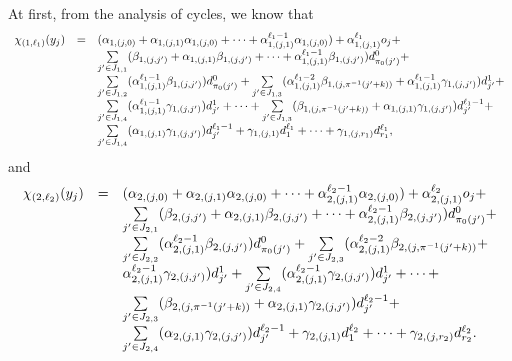 \documentclass[runningheads,a4paper]{llncs}
\begin{document}
At first, from the analysis of cycles, we know that
\[
\begin{array}{l c l}
\chi_{(1,\ell_1)}(y_j)  & = & (\alpha_{1,(j,0)} + \alpha_{1,(j,1)} \alpha_{1,(j,0)}+ \dots +\alpha^{\ell_1-1}_{1,(j,1)} \alpha_{1,(j,0)}) + \alpha^{\ell_1}_{1,(j,1)} o_j + \\
& & \sum \limits_{j' \in J_{1,1}} (\beta_{1,(j,j')}+\alpha_{1,(j,1)}\beta_{1,(j,j')} + \dots +\alpha^{\ell_1-1}_{1,(j,1)}  \beta_{1,(j,j')}) d^0_{\pi_0(j')} + \\
%
& & \sum \limits_{j' \in J_{1,2}} (\alpha^{\ell_1-1}_{1,(j,1)}\beta_{1,(j,j')}) d^0_{\pi_0(j')} +  \sum \limits_{j' \in J_{1,3}} (\alpha^{\ell_1-2}_{1,(j,1)}\beta_{1,(j, \pi^{-1}(j'+k))}+\alpha^{\ell_1-1}_{1,(j,1)}\gamma_{1,(j,j')}) d^1_{j'} + \\
%
& & \sum \limits_{j' \in J_{1,4}} (\alpha^{\ell_1-1}_{1,(j,1)} \gamma_{1,(j,j')}) d^1_{j'} + \dots + \sum \limits_{j' \in J_{1,3}} (\beta_{1,(j, \pi^{-1}(j'+k))}+\alpha_{1,(j,1)}\gamma_{1,(j,j')}) d^{\ell_1-1}_{j'} + \\
%
& & \sum \limits_{j' \in J_{1,4}} (\alpha_{1,(j,1)} \gamma_{1,(j,j')}) d^{\ell_1-1}_{j'} + \gamma_{1,(j, 1)} d^{\ell_1}_{1} + \dots + \gamma_{1,(j,r_1)} d^{\ell_1}_{r_1},
\end{array} 
\]
and
\[
\begin{array}{l c l}
\chi_{(2,\ell_2)}(y_j)  & = & (\alpha_{2,(j,0)} + \alpha_{2,(j,1)} \alpha_{2,(j,0)}+ \dots +\alpha^{\ell_2-1}_{2,(j,1)} \alpha_{2,(j,0)}) + \alpha^{\ell_2}_{2,(j,1)} o_j + \\
%
& & \sum \limits_{j' \in J_{2,1}} (\beta_{2,(j,j')}+\alpha_{2,(j,1)}\beta_{2,(j,j')} + \dots +\alpha^{\ell_2-1}_{2,(j,1)}  \beta_{2,(j,j')}) d^0_{\pi_0(j')} + \\
%
& & \sum \limits_{j' \in J_{2,2}} (\alpha^{\ell_2-1}_{2,(j,1)}\beta_{2,(j,j')}) d^0_{\pi_0(j')} +  \sum \limits_{j' \in J_{2,3}} (\alpha^{\ell_2-2}_{2,(j,1)}\beta_{2,(j, \pi^{-1}(j'+k))}+\\
%
& & \alpha^{\ell_2-1}_{2,(j,1)}\gamma_{2,(j,j')}) d^1_{j'} +  \sum \limits_{j' \in J_{2,4}} (\alpha^{\ell_2-1}_{2,(j,1)} \gamma_{2,(j,j')}) d^1_{j'} + \dots + \\
%
& & \sum \limits_{j' \in J_{2,3}} (\beta_{2,(j, \pi^{-1}(j'+k))}+ \alpha_{2,(j,1)}\gamma_{2,(j,j')}) d^{\ell_2-1}_{j'} + \\
%
& &  \sum \limits_{j' \in J_{2,4}} (\alpha_{2,(j,1)} \gamma_{2,(j,j')}) d^{\ell_2-1}_{j'} + \gamma_{2,(j, 1)} d^{\ell_2}_{1} +  \dots + \gamma_{2,(j,r_2)} d^{\ell_2}_{r_2}.
\end{array} 
\]
\end{document}
